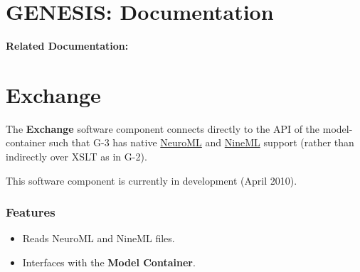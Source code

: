 \documentclass[12pt]{article}
\begin{document}
\section*{GENESIS: Documentation}

{\bf Related Documentation:}

\section*{Exchange}

The {\bf Exchange} software component connects directly to the API of
the model-container such that G-3 has native
\href{http://www.neuroml.org/}{NeuroML} and
\href{http://www.nineml.org/}{NineML} support (rather than indirectly
over XSLT as in G-2).

This software component is currently in development (April 2010).


\subsubsection*{Features}

\begin{itemize}

\item Reads NeuroML and NineML files.

\item Interfaces with the {\bf Model Container}.

\end{itemize}
\end{document}
